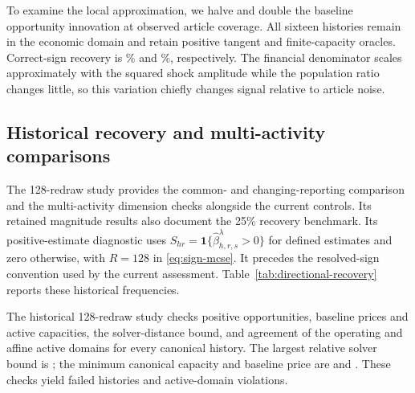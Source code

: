 

To examine the local approximation, we halve and double the baseline
opportunity innovation at observed article coverage.
All sixteen histories remain in the economic domain and retain positive
tangent and finite-capacity oracles.
Correct-sign recovery is
\% and
\%, respectively.
The financial denominator scales approximately with the squared shock
amplitude while the population ratio changes little, so this variation
chiefly changes signal relative to article noise.

\subsection{Historical recovery and multi-activity
comparisons}\label{app:historical-recovery}

The 128-redraw study provides the common- and changing-reporting comparison
and the multi-activity dimension checks alongside the current controls.
Its retained magnitude results also document the 25\% recovery benchmark.
Its positive-estimate diagnostic uses
$S_{hr}=\mathbf1\{\widehat\beta_{h,r,s}^\lambda>0\}$ for defined
estimates and zero otherwise, with $R=128$ in \eqref{eq:sign-mcse}.
It precedes the resolved-sign convention used by the current assessment.
Table~\ref{tab:directional-recovery} reports these historical frequencies.

The historical 128-redraw study checks positive opportunities, baseline prices
and active capacities, the solver-distance bound, and agreement of the
operating and affine active domains for every canonical history.
The largest relative solver bound is
; the minimum canonical capacity and
baseline price are  and
.
These checks yield  failed histories and
 active-domain violations.



